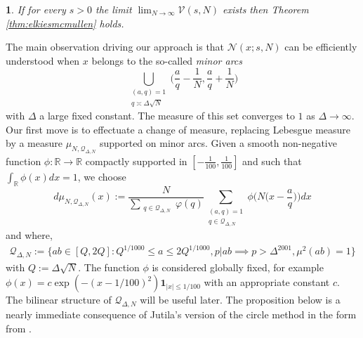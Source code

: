 \documentclass[12pt,reqno]{amsart}
\theoremstyle{plain}
\numberwithin{equation}{section}
\numberwithin{figure}{section}
\theoremstyle{plain}
\newtheorem{prop}{\protect\propositionname}
\theoremstyle{definition}
\theoremstyle{remark}
\providecommand{\propositionname}{Proposition}
\begin{document}
   \begin{prop} \label{prop0}
     If for every $s > 0$ the limit
     $ \lim_{N \rightarrow \infty} \mathcal{V}(s,N)$
     exists then Theorem \ref{thm:elkiesmcmullen} holds. 
\end{prop}

The main observation driving our approach is that $\mathcal{N}(x; s, N)$ can be efficiently understood when $x$ belongs to the so-called \textit{minor arcs}
$$
\bigcup_{\substack{(a,q) = 1 \\ q \asymp \Delta \sqrt{N}}} 
\Big ( \frac{a}{q} - \frac{1}{N}, \frac{a}{q} + \frac{1}{N} \Big )
$$
with $\Delta$ a large fixed constant. The measure of this set converges to $1$ as $\Delta \rightarrow \infty$. 
Our first move is to effectuate a change of measure,
replacing Lebesgue measure by a measure $\mu_{N, \mathcal{Q}_{\Delta, N}}$ supported on minor arcs.
Given a smooth non-negative function $\phi:\mathbb{R}\rightarrow \mathbb{R}$ compactly supported in $[- \tfrac{1}{100}, \tfrac{1}{100}]$ and
such that
$\int_\mathbb{R} \phi(x)dx = 1$, 
we choose
\begin{equation}\label{def Jutila measure}
d\mu_{ N, \mathcal{Q}_{\Delta, N}}(x) := \frac{N}{\sum_{\substack{q \in \mathcal{Q}_{\Delta, N}}} \varphi(q)} \sum_{\substack{(a,q) = 1 \\ q \in \mathcal{Q}_{\Delta, N}}}  \phi \Big ( N \Big ( x - \frac{a}{q} \Big ) \Big ) dx
\end{equation}
and where,  
    \begin{align} \label{eq:qu}
    \mathcal{Q}_{\Delta, N} := 
    \Big \{ a b \in [Q, 2Q]: Q^{1/1000} \leq a \leq 2 Q^{1/1000}, p | a b \implies p > \Delta^{2001}, \mu^2(a b) = 1 \Big \}
    \end{align}
    with $Q := \Delta \sqrt{N}$. The function $\phi$ is considered globally fixed, for example $\phi(x) = c \exp( - (x - 1/100)^2) \mathbf{1}_{|x| \leq 1/100}$ with an appropriate constant $c$.   
    The bilinear structure of $\mathcal{Q}_{\Delta, N}$ will be useful later. The proposition below is a nearly immediate consequence of Jutila's version of the circle method \cite{Jutila} in the form from \cite{Mayank}. 
\end{document}
